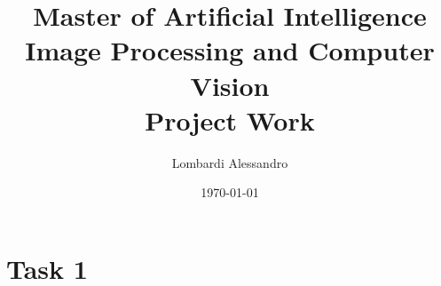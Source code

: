 \documentclass[a4paper,12pt, hidelinks]{report}
\title{
   	\Large Master of Artificial Intelligence \\
		Image Processing and Computer Vision \\
  	\Huge{\textbf{Project Work}} \\
}
\author{Lombardi Alessandro}
\date{\today}
\begin{document}
\maketitle
\justify

\tableofcontents

\chapter{Task 1}
\end{document}
